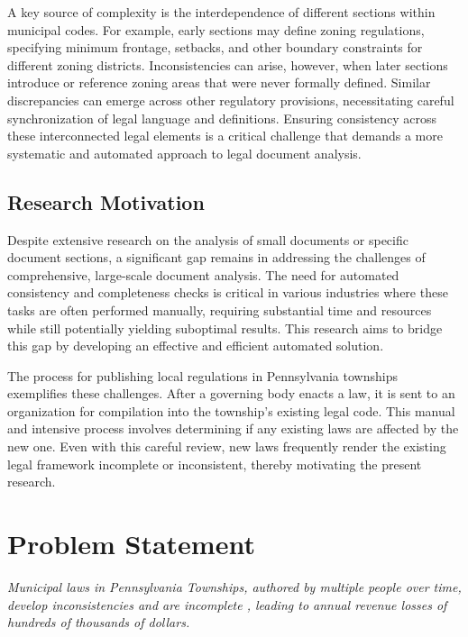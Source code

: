 A key source of complexity is the interdependence of different sections within municipal codes. For example, early sections may define zoning regulations, specifying minimum frontage, setbacks, and other boundary constraints for different zoning districts. Inconsistencies can arise, however, when later sections introduce or reference zoning areas that were never formally defined. Similar discrepancies can emerge across other regulatory provisions, necessitating careful synchronization of legal language and definitions. Ensuring consistency across these interconnected legal elements is a critical challenge that demands a more systematic and automated approach to legal document analysis.

\subsection{Research Motivation}
Despite extensive research on the analysis of small documents or specific document sections, a significant gap remains in addressing the challenges of comprehensive, large-scale document analysis. The need for automated consistency and completeness checks is critical in various industries where these tasks are often performed manually, requiring substantial time and resources while still potentially yielding suboptimal results. This research aims to bridge this gap by developing an effective and efficient automated solution.

The process for publishing local regulations in Pennsylvania townships exemplifies these challenges. After a governing body enacts a law, it is sent to an organization for compilation into the township's existing legal code. This manual and intensive process involves determining if any existing laws are affected by the new one. Even with this careful review, new laws frequently render the existing legal framework incomplete or inconsistent, thereby motivating the present research.

\section{Problem Statement}
\textit{Municipal laws in Pennsylvania Townships, authored by multiple people over time, develop inconsistencies and are incomplete \parencite{RefWorks:RefID:144-curley2024municipal,RefWorks:RefID:145-rau2024municipal,RefWorks:RefID:146-sanders2024municipal}, leading to annual revenue losses of hundreds of thousands of dollars. \parencite{RefWorks:RefID:147-bosco2024leading}}

